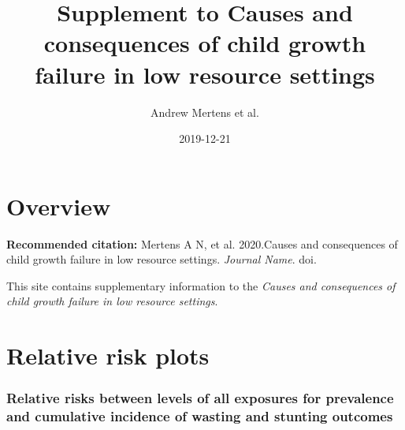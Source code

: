 \documentclass[9pt,]{book}
\title{Supplement to Causes and consequences of child growth failure in low
resource settings}
\author{Andrew Mertens et al.}
\date{2019-12-21}
\begin{document}
\maketitle

{
\setcounter{tocdepth}{1}
\tableofcontents
}
\chapter{Overview}\label{overview}

\textbf{Recommended citation:} Mertens A N, et al. 2020.Causes and
consequences of child growth failure in low resource settings.
\emph{Journal Name}. doi.

This site contains supplementary information to the \emph{Causes and
consequences of child growth failure in low resource settings}.

\chapter{Relative risk plots}\label{RR}

\raggedright

\subsection{Relative risks between levels of all exposures for
prevalence and cumulative incidence of wasting and stunting
outcomes}\label{relative-risks-between-levels-of-all-exposures-for-prevalence-and-cumulative-incidence-of-wasting-and-stunting-outcomes}
\end{document}

